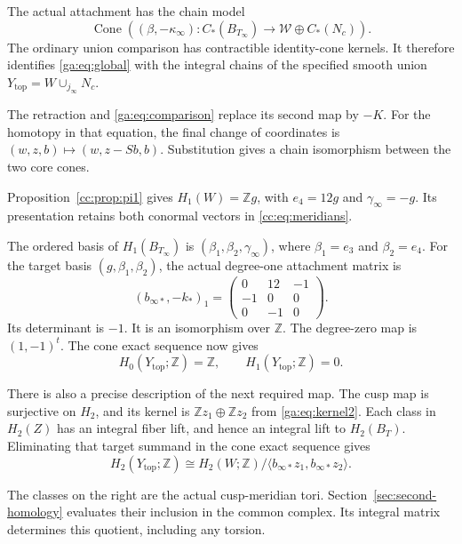 The actual attachment has the chain model
\begin{equation}\label{ga:eq:global}
\operatorname{Cone}\left((\beta,-\kappa_\infty):
C_*(B_{T_\infty})\to\mathcal W\oplus C_*(N_c)\right).
\end{equation}
The ordinary union comparison has contractible identity-cone kernels.
It therefore identifies \eqref{ga:eq:global} with the integral chains
of the specified smooth union $Y_{\mathrm{top}}=W\cup_{j_\infty}N_c$.

The retraction and \eqref{ga:eq:comparison} replace its second map by $-K$.
For the homotopy in that equation, the final change of coordinates is
$(w,z,b)\mapsto(w,z-Sb,b)$.
Substitution gives a chain isomorphism between the two core cones.

Proposition~\ref{cc:prop:pi1} gives
$H_1(W)=\mathbb Zg$, with $e_4=12g$ and $\gamma_\infty=-g$.
Its presentation retains both conormal vectors in \eqref{cc:eq:meridians}.

The ordered basis of $H_1(B_{T_\infty})$ is
$(\beta_1,\beta_2,\gamma_\infty)$, where $\beta_1=e_3$ and $\beta_2=e_4$.
For the target basis $(g,\beta_1,\beta_2)$, the actual degree-one
attachment matrix is
\begin{equation}\label{ga:eq:global1}
(b_{\infty*},-k_*)_1=
\begin{pmatrix}0&12&-1\\-1&0&0\\0&-1&0\end{pmatrix}.
\end{equation}
Its determinant is $-1$. It is an isomorphism over $\mathbb Z$.
The degree-zero map is $(1,-1)^t$.
The cone exact sequence now gives
\begin{equation}\label{ga:eq:first}
H_0(Y_{\mathrm{top}};\mathbb Z)=\mathbb Z,
\qquad H_1(Y_{\mathrm{top}};\mathbb Z)=0.
\end{equation}

There is also a precise description of the next required map.
The cusp map is surjective on $H_2$, and its kernel is
$\mathbb Zz_1\oplus\mathbb Zz_2$ from \eqref{ga:eq:kernel2}.
Each class in $H_2(Z)$ has an integral fiber lift, and hence an integral
lift to $H_2(B_T)$. Eliminating that target summand in the cone exact
sequence gives
\begin{equation}\label{ga:eq:next}
H_2(Y_{\mathrm{top}};\mathbb Z)
\cong H_2(W;\mathbb Z)/
\langle b_{\infty*}z_1,b_{\infty*}z_2\rangle.
\end{equation}

The classes on the right are the actual cusp-meridian tori.
Section~\ref{sec:second-homology} evaluates their inclusion in the
common complex. Its integral matrix determines this quotient,
including any torsion.

